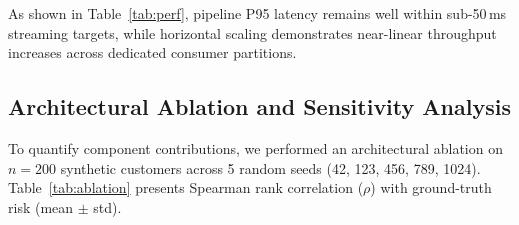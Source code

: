 \documentclass[conference]{IEEEtran}
\begin{document}
\begin{table}[htbp]
\caption{Systems metrics from the automated suite}
\label{tab:perf}
\centering\scriptsize
{}
\end{table}

As shown in Table~\ref{tab:perf}, pipeline P95 latency remains well within sub-50\,ms streaming targets, while horizontal scaling demonstrates near-linear throughput increases across dedicated consumer partitions.

\subsection{Architectural Ablation and Sensitivity Analysis}
\label{sec:ablation}

To quantify component contributions, we performed an architectural ablation on $n{=}200$ synthetic customers across 5 random seeds (42, 123, 456, 789, 1024). Table~\ref{tab:ablation} presents Spearman rank correlation ($\rho$) with ground-truth risk (mean $\pm$ std). 

\begin{table}[htbp]
\caption{Architectural ablation ($n{=}200$, 5 seeds). $\rho$ = Spearman rank correlation with ground truth (mean $\pm$ std).}
\label{tab:ablation}
\centering\scriptsize
{}
\end{table}
\end{document}
